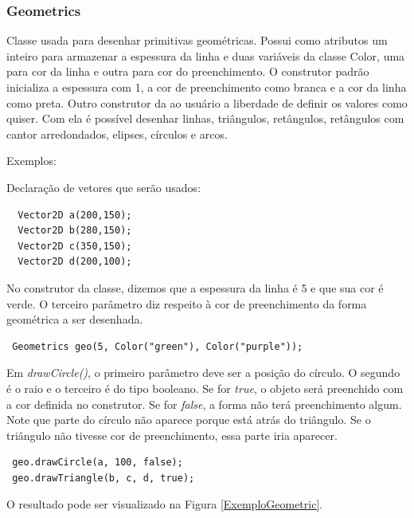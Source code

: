 \subsubsection{Geometrics}
%
%
Classe usada para desenhar primitivas geométricas. Possui como atributos um inteiro para armazenar a espessura da linha e duas variáveis da classe Color, uma para cor da linha e outra para cor do preenchimento. O construtor padrão inicializa a espessura com 1, a cor de preenchimento como branca e a cor da linha como preta. Outro construtor da ao usuário a liberdade de definir os valores como quiser. Com ela é possível desenhar linhas, triângulos, retângulos, retângulos com cantor arredondados, elipses, círculos e arcos. 
\par 
Exemplos: 
\par
Declaração de vetores que serão usados:
%
\begin{lstlisting}
  Vector2D a(200,150);
  Vector2D b(280,150);
  Vector2D c(350,150);
  Vector2D d(200,100);
\end{lstlisting}
%
%
\par 
No construtor da classe, dizemos que a espessura da linha é 5 e que sua cor é verde. O terceiro parâmetro diz respeito à cor de preenchimento da forma geométrica a ser desenhada. 
%
\begin{lstlisting}
 Geometrics geo(5, Color("green"), Color("purple"));
\end{lstlisting}
%
Em \textit{drawCircle()}, o primeiro parâmetro deve ser a posição do círculo. O segundo é o raio e o terceiro é do tipo booleano. Se for \textit{true}, o objeto será preenchido com a cor definida no construtor. Se for \textit{false}, a forma não terá preenchimento algum. Note que parte do círculo não aparece porque está atrás do triângulo. Se o triângulo não tivesse cor de preenchimento, essa parte iria aparecer. 
%
\begin{lstlisting}
 geo.drawCircle(a, 100, false);
 geo.drawTriangle(b, c, d, true);
\end{lstlisting}
% 
%
O resultado pode ser visualizado na Figura \ref{ExemploGeometric}.
%
